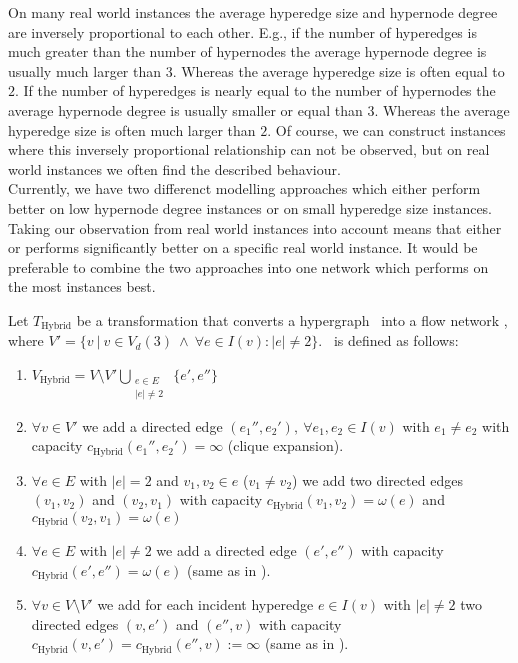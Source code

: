 On many real world instances the average hyperedge size and hypernode degree are inversely
proportional to each other. E.g., if the number of hyperedges is much greater than the
number of hypernodes the average hypernode degree is usually much larger than $3$. Whereas
the average hyperedge size is often equal to $2$. If the number of hyperedges is nearly equal
to the number of hypernodes the average hypernode degree is usually smaller or equal than $3$. Whereas
the average hyperedge size is often much larger than $2$. Of course, we can construct instances
where this inversely proportional relationship can not be observed, but on real world instances
we often find the described behaviour. \\
Currently, we have two differenct modelling approaches which either perform better on low hypernode degree
instances or on small hyperedge size instances. Taking our observation from real world instances 
into account means that either  or  performs significantly better on
a specific real world instance. It would be preferable to combine the two approaches into one network 
which performs on the most instances best. \\

\begin{definition}
Let $T_{\text{Hybrid}}$ be a transformation that converts a hypergraph \HypergraphDef~into 
a flow network \Hybrid, where $V' = \{v\ |\ v \in V_d(3)\ 
\land\ \forall e \in I(v): |e| \neq 2\}$. \ShortHybrid~is defined as follows:
\begin{enumerate}
\item $V_{\text{Hybrid}} = V\setminus V' \bigcup\limits_{\substack{e \in E \\ |e| \neq 2}}\ \{e', e''\}$
\item $\forall v \in V'$ we add a directed edge $(e_1'', e_2'),\ \forall e_1, e_2 \in I(v)$ 
      with $e_1 \neq e_2$ with capacity $c_{\text{Hybrid}}(e_1'', e_2') = \infty$ (clique expansion).
\item $\forall e \in E$ with $|e| = 2$ and $v_1,v_2 \in e$ ($v_1 \neq v_2$) we add 
      two directed edges $(v_1,v_2)$ and $(v_2,v_1)$ with capacity $c_{\text{Hybrid}}(v_1,v_2) = \omega(e)$
      and $c_{\text{Hybrid}}(v_2,v_1) = \omega(e)$
\item $\forall e \in E$ with $|e| \neq 2$ we add a directed edge $(e',e'')$
      with capacity $c_{\text{Hybrid}}(e',e'') = \omega(e)$ (same as in ).
\item $\forall v \in V\setminus V'$ we add for each incident hyperedge $e \in I(v)$ with $|e| \neq 2$ 
      two directed edges $(v,e')$ and $(e'',v)$ with capacity 
      $c_{\text{Hybrid}}(v,e') = c_{\text{Hybrid}}(e'',v) := \infty$ (same as in ).
\end{enumerate} 
\end{definition}

